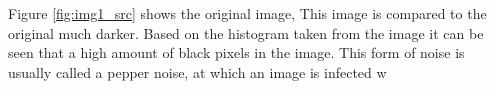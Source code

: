 Figure \ref{fig:img1_src} shows the original image, This image is compared to the original much darker.  Based on the histogram taken from the image it can be seen that a high amount of black pixels in the image. This form of noise is usually called a pepper noise, at which an image is infected w